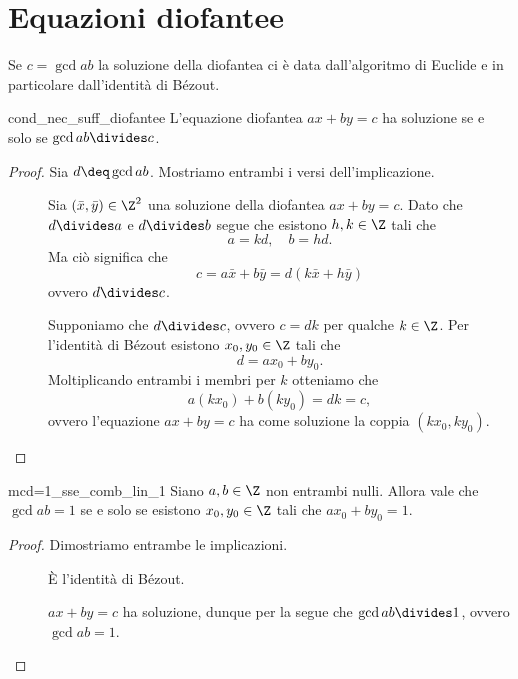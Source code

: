 \section{Equazioni diofantee}


\begin{remark}
    Se $c = \gcd{a}{b}$ la soluzione della diofantea ci è data dall'algoritmo di Euclide e in particolare dall'identità di Bézout.
\end{remark}

\begin{proposition}
    {cond_nec_suff_diofantee}
    L'equazione diofantea $ax + by = c$ ha soluzione se e solo se $\gcd{a}{b} \divides c$.
\end{proposition}
\begin{proof}
    Sia $d \deq \gcd{a}{b}$. Mostriamo entrambi i versi dell'implicazione.
    \begin{description}
        \item[\boximpl ] Sia $(\bar x, \bar y) \in \Z^2$ una soluzione della diofantea $ax + by = c$. Dato che $d \divides a$ e $d \divides b$ segue che esistono $h, k \in \Z$ tali che \[
            a = kd, \quad b = hd.    
        \] Ma ciò significa che \[
            c = a\bar x + b\bar y = d(k\bar x + h\bar y)    
        \] ovvero $d \divides c$.
        \item[\boximplby] Supponiamo che $d \divides c$, ovvero $c = dk$ per qualche $k \in \Z$. Per l'identità di Bézout esistono $x_0, y_0 \in \Z$ tali che \[
            d = ax_0 + by_0.    
        \] Moltiplicando entrambi i membri per $k$ otteniamo che \[
            a(kx_0) + b(ky_0) = dk = c,    
        \] ovvero l'equazione $ax + by = c$ ha come soluzione la coppia $(kx_0, ky_0)$. \qedhere
    \end{description}
\end{proof}

\begin{corollary} {mcd=1_sse_comb_lin_1}
    Siano $a, b \in \Z$ non entrambi nulli. Allora vale che $\gcd{a}{b} = 1$ se e solo se esistono $x_0, y_0 \in \Z$ tali che $ax_0 + by_0 = 1$.
\end{corollary}
\begin{proof}
    Dimostriamo entrambe le implicazioni.
    \begin{description}
        \item[\boximpl ] È l'identità di Bézout.
        \item[\boximplby] $ax + by = c$ ha soluzione, dunque per la  segue che $\gcd{a}{b} \divides 1$, ovvero $\gcd{a}{b} = 1$.
    \end{description}
\end{proof}


